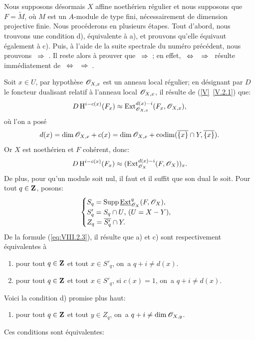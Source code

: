 Nous supposons d\'esormais $X$ affine noeth\'erien r\'egulier et nous supposons que \hbox{$F=\widetilde{M}$}, o\`u $M$ est un $A$-module de type fini, n\'ecessairement de dimension projective finie. Nous proc\'ederons en plusieurs \'etapes. Tout d'abord, nous trouvons une condition d), \'equivalente \`a a), et prouvons qu'elle \'equivaut \'egalement \`a c). Puis, \`a l'aide de la suite spectrale du num\'ero pr\'ec\'edent, nous prouvons ~$\To$~. Il reste alors \`a prouver que ~$\To$~; en effet, ~$\Ssi$~~$\To$~ r\'esulte imm\'ediatement de ~$\Ssi$~~$\To$~.

Soit $x\in U$, par hypoth\`ese ${\mathscr O}_{X, x}$ est un anneau local r\'egulier; en d\'esignant par $D$ le foncteur dualisant relatif \`a l'anneau local ${\mathscr O}_{X, x}$, il r\'esulte de (\ref{V}~\ref{V.2.1}) que:
\[D\operatorname{H}^{i-c(x)}(F_x)\approx \operatorname{Ext}^{d(x)-i}_{{\mathscr O}_{X, x}}(F_x, {\mathscr O}_{X, x}), \]
o\`u l'on a pos\'e
\begin{equation} \label{eq:VIII.2.2} d(x)=\dim {\mathscr O}_{X, x} + c(x) = \dim {\mathscr O}_{X, x}+\operatorname{codim}(\overline{\{x\}}\cap Y, \overline{\{x\}}).
\end{equation}
Or $X$ est noeth\'erien et $F$ coh\'erent, donc:
\begin{equation} \label{eq:VIII.2.3} D\operatorname{H}^{i-c(x)}(F_x)\approx (\operatorname{Ext}^{d(x)-i}_{\mathscr{O}_X}(F, \mathscr{O}_X))_x.
\end{equation}
De plus, pour qu'un module soit nul, il faut et il suffit que son dual le soit. Pour tout $q\in\mathbf{Z}$, posons:
\begin{equation} \label{eq:VIII.2.4}
\begin{cases}
S_q=\operatorname{Supp} \mathop{\underline{\mathrm{Ext}}}\nolimits^q_{\mathscr{O}_X}(F, \mathscr{O}_X), \\
S'_q=S_q\cap U\text{, (}U=X-Y\text{)}, \\
Z_q=\overline{S'_q}\cap Y.
\end{cases}
\end{equation}
De la formule (\ref{eq:VIII.2.3}), il r\'esulte que a) et c) sont respectivement \'equivalentes \`a
\begin{enumerate}
\item[a$'$)]
pour tout $q\in\mathbf{Z}$ et tout $x\in S'_q$, on~a $q+i\neq d(x)$.

\item[c$'$)]
pour tout $q\in\mathbf{Z}$ et tout $x\in S'_q$, si $c(x)=1$, on~a $q+i\neq d(x)$.
\end{enumerate}
\noindent Voici la condition d) promise plus haut:
\begin{enumerate}
\item[d)]
pour tout $q\in \mathbf{Z}$ et tout $y\in Z_q$, on~a $q+i\neq \dim {\mathscr O}_{X, y}$.
\end{enumerate}
\noindent Ces conditions sont \'equivalentes:

